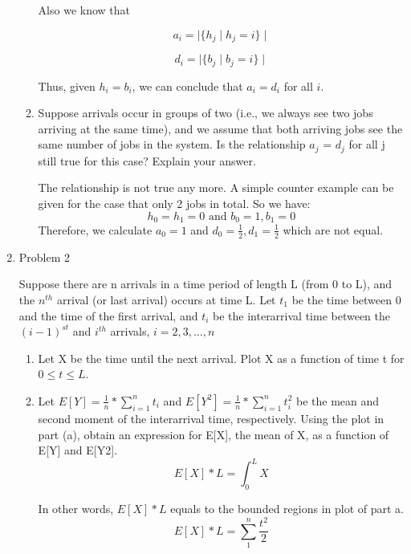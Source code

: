 \documentclass[12pt]{article}
\begin{document}
\begin{enumerate}
\begin{enumerate}
Also we know that

\begin{equation}
a_i = \mid \{h_j \mid h_j = i\} \mid
\end{equation}

\begin{equation}
d_i = \mid \{b_j \mid b_j = i\} \mid
\end{equation}

Thus, given $h_i = b_i$, we can conclude that $a_i = d_i$ for all $i$.
\item{} Suppose arrivals occur in groups of two (i.e., we always see two jobs arriving at the same time), and we assume that both arriving jobs see the same number of jobs in the system. Is the relationship $a_j$ = $d_j$ for all j still true for this case? Explain your answer.

The relationship is not true any more. A simple counter example can be given for the case that only 2 jobs in total. So we have:
\begin{equation}
h_0=h_1=0 \text{ and }b_0=1,b_1=0
\end{equation}
Therefore, we calculate $a_0=1$ and $d_0=\frac{1}{2}, d_1=\frac{1}{2}$ which are not equal.

\end{enumerate}

\medskip

\item{Problem 2}

Suppose there are n arrivals in a time period of length L (from 0 to L), and the $n^{th}$ arrival (or last arrival) occurs at time L. Let $t_1$ be the time between 0 and the time of the first arrival, and $t_i$ be the interarrival time between the $(i-1)^{st}$ and $i^{th}$ arrivals, $i = 2, 3, \dotsc, n$
\begin{enumerate}
\item{} Let X be the time until the next arrival. Plot X as a function of time t for $0 \le t \le L$.

\item{} Let $E[Y] = \frac{1}{n} * \sum^{n}_{i=1}{t_i}$ and $E[Y^2] = \frac{1}{n} * \sum^{n}_{i=1}{t_i^2}$ be the mean and second moment of the interarrival time, respectively. Using the plot in part (a), obtain an expression for E[X], the mean of X, as a function of E[Y] and E[Y2].
\begin{equation}
E[X] * L = \int_{0}^{L}{X}
\end{equation}

In other words, $E[X] * L$ equals to the bounded regions in plot of part a.
\begin{equation}\label{eq:region}
E[X] * L = \sum_{1}^{n}{\frac{t^2}{2}}
\end{equation}


\end{enumerate}
\end{enumerate}
\end{document}
